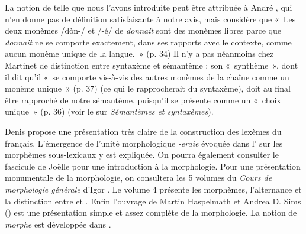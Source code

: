 {    La notion de  telle que nous l’avons introduite peut être attribuée à André \citet{martinet1985syntaxe}, qui n’en donne pas de définition satisfaisante à notre avis, mais considère que «~Les deux monèmes /dòn-/ et /-é/ de \textit{donnait} sont des monèmes libres parce que \textit{donnait} ne se comporte exactement, dans ses rapports avec le contexte, comme aucun monème unique de la langue.~» (p. 34) Il n’y a pas néanmoins chez Martinet de distinction entre syntaxème et sémantème : son «~synthème~», dont il dit qu’il «~se comporte vis-à-vis des autres monèmes de la chaîne comme un monème unique~» (p. 37) (ce qui le rapprocherait du syntaxème), doit au final être rapproché de notre sémantème, puisqu’il se présente comme un «~choix unique~» (p. 36) (voir le  sur \textit{Sémantèmes et syntaxèmes}).

    Denis \citet{apotheloz2002construction} propose une présentation très claire de la construction des lexèmes du français. L’émergence de l'unité morphologique \textit{{}-eraie} évoquée dans l' sur les morphèmes sous-lexicaux y est expliquée. On pourra également consulter le fascicule de Joëlle \citet{gardes-tamine1990grammaire} pour une introduction à la morphologie. Pour une présentation monumentale de la morphologie, on consultera les 5 volumes du \textit{Cours de morphologie générale} d’Igor \citet{melcuk1993cours}. Le volume 4 présente les morphèmes, l’alternance et la distinction entre  et . Enfin l'ouvrage de Martin Haspelmath et Andrea D. Sims (\citeyear{haspelmath2013understanding}) est une présentation simple et assez complète de la morphologie. La notion de \textit{morphe} est développée dans \citet{haspelmath2020morph}.

}%
